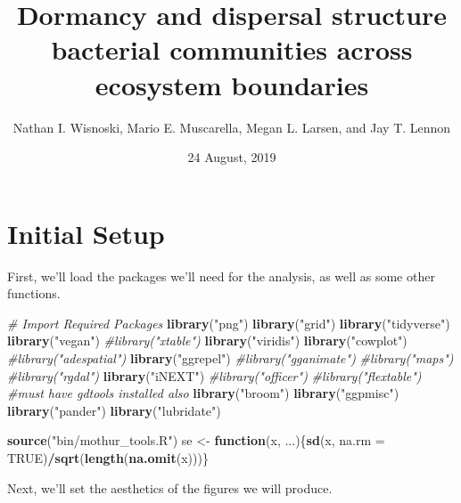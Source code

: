 \documentclass[]{article}
\title{Dormancy and dispersal structure bacterial communities across ecosystem
boundaries}
\author{Nathan I. Wisnoski, Mario E. Muscarella, Megan L. Larsen, and Jay T.
Lennon}
\date{24 August, 2019}
\newenvironment{Shaded}{\begin{snugshade}}{\end{snugshade}}
\newcommand{\CommentTok}[1]{\textcolor[rgb]{0.56,0.35,0.01}{\textit{#1}}}
\newcommand{\ControlFlowTok}[1]{\textcolor[rgb]{0.13,0.29,0.53}{\textbf{#1}}}
\newcommand{\DataTypeTok}[1]{\textcolor[rgb]{0.13,0.29,0.53}{#1}}
\newcommand{\KeywordTok}[1]{\textcolor[rgb]{0.13,0.29,0.53}{\textbf{#1}}}
\newcommand{\NormalTok}[1]{#1}
\newcommand{\OperatorTok}[1]{\textcolor[rgb]{0.81,0.36,0.00}{\textbf{#1}}}
\newcommand{\OtherTok}[1]{\textcolor[rgb]{0.56,0.35,0.01}{#1}}
\newcommand{\StringTok}[1]{\textcolor[rgb]{0.31,0.60,0.02}{#1}}
\begin{document}
\maketitle

\hypertarget{initial-setup}{%
\section{Initial Setup}\label{initial-setup}}

First, we'll load the packages we'll need for the analysis, as well as
some other functions.

\begin{Shaded}
\begin{Highlighting}[]
\CommentTok{# Import Required Packages}
\KeywordTok{library}\NormalTok{(}\StringTok{"png"}\NormalTok{)}
\KeywordTok{library}\NormalTok{(}\StringTok{"grid"}\NormalTok{)}
\KeywordTok{library}\NormalTok{(}\StringTok{"tidyverse"}\NormalTok{)   }
\KeywordTok{library}\NormalTok{(}\StringTok{"vegan"}\NormalTok{)}
\CommentTok{#library("xtable")}
\KeywordTok{library}\NormalTok{(}\StringTok{"viridis"}\NormalTok{)}
\KeywordTok{library}\NormalTok{(}\StringTok{"cowplot"}\NormalTok{)}
\CommentTok{#library("adespatial")}
\KeywordTok{library}\NormalTok{(}\StringTok{"ggrepel"}\NormalTok{)}
\CommentTok{#library("gganimate")}
\CommentTok{#library("maps")}
\CommentTok{#library("rgdal")}
\KeywordTok{library}\NormalTok{(}\StringTok{"iNEXT"}\NormalTok{)}
\CommentTok{#library("officer")}
\CommentTok{#library("flextable") #must have gdtools installed also}
\KeywordTok{library}\NormalTok{(}\StringTok{"broom"}\NormalTok{)}
\KeywordTok{library}\NormalTok{(}\StringTok{"ggpmisc"}\NormalTok{)}
\KeywordTok{library}\NormalTok{(}\StringTok{"pander"}\NormalTok{)}
\KeywordTok{library}\NormalTok{(}\StringTok{"lubridate"}\NormalTok{)}

\KeywordTok{source}\NormalTok{(}\StringTok{"bin/mothur_tools.R"}\NormalTok{)}
\NormalTok{se <-}\StringTok{ }\ControlFlowTok{function}\NormalTok{(x, ...)\{}\KeywordTok{sd}\NormalTok{(x, }\DataTypeTok{na.rm =} \OtherTok{TRUE}\NormalTok{)}\OperatorTok{/}\KeywordTok{sqrt}\NormalTok{(}\KeywordTok{length}\NormalTok{(}\KeywordTok{na.omit}\NormalTok{(x)))\}}
\end{Highlighting}
\end{Shaded}

Next, we'll set the aesthetics of the figures we will produce.
\end{document}
